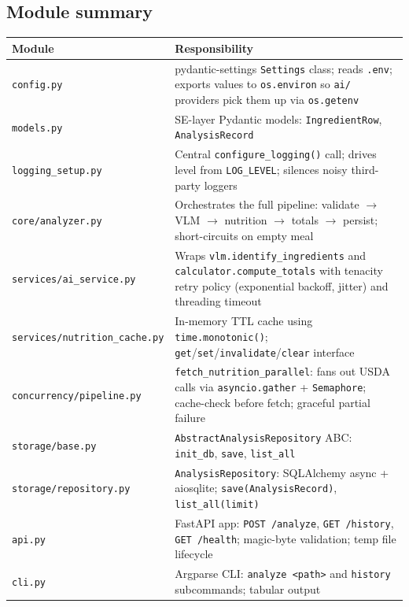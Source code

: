 \documentclass[11pt,a4paper]{article}
\begin{document}
\subsection{Module summary}

\begin{tabularx}{\textwidth}{@{}lX@{}}
\toprule
\textbf{Module} & \textbf{Responsibility} \\
\midrule
\texttt{config.py} & pydantic-settings \texttt{Settings} class; reads \texttt{.env}; exports values to \texttt{os.environ} so \texttt{ai/} providers pick them up via \texttt{os.getenv} \\
\texttt{models.py} & SE-layer Pydantic models: \texttt{IngredientRow}, \texttt{AnalysisRecord} \\
\texttt{logging\_setup.py} & Central \texttt{configure\_logging()} call; drives level from \texttt{LOG\_LEVEL}; silences noisy third-party loggers \\
\texttt{core/analyzer.py} & Orchestrates the full pipeline: validate $\to$ VLM $\to$ nutrition $\to$ totals $\to$ persist; short-circuits on empty meal \\
\texttt{services/ai\_service.py} & Wraps \texttt{vlm.identify\_ingredients} and \texttt{calculator.compute\_totals} with tenacity retry policy (exponential backoff, jitter) and threading timeout \\
\texttt{services/nutrition\_cache.py} & In-memory TTL cache using \texttt{time.monotonic()}; \texttt{get}/\texttt{set}/\texttt{invalidate}/\texttt{clear} interface \\
\texttt{concurrency/pipeline.py} & \texttt{fetch\_nutrition\_parallel}: fans out USDA calls via \texttt{asyncio.gather} + \texttt{Semaphore}; cache-check before fetch; graceful partial failure \\
\texttt{storage/base.py} & \texttt{AbstractAnalysisRepository} ABC: \texttt{init\_db}, \texttt{save}, \texttt{list\_all} \\
\texttt{storage/repository.py} & \texttt{AnalysisRepository}: SQLAlchemy async + aiosqlite; \texttt{save(AnalysisRecord)}, \texttt{list\_all(limit)} \\
\texttt{api.py} & FastAPI app: \texttt{POST /analyze}, \texttt{GET /history}, \texttt{GET /health}; magic-byte validation; temp file lifecycle \\
\texttt{cli.py} & Argparse CLI: \texttt{analyze <path>} and \texttt{history} subcommands; tabular output \\
\bottomrule
\end{tabularx}
\end{document}
